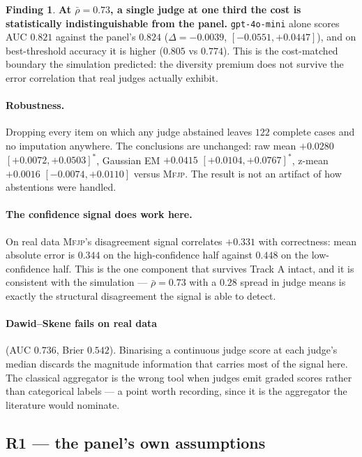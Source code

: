 \documentclass[11pt]{article}
\theoremstyle{definition}
\newtheorem{finding}{Finding}
\newcommand{\rhobar}{\ensuremath{\bar{\rho}}}
\newcommand{\mfjp}{\textsc{Mfjp}}
\begin{document}
\begin{finding}
\textbf{At $\rhobar=0.73$, a single judge at one third the cost is statistically
indistinguishable from the panel.} \texttt{gpt-4o-mini} alone scores AUC $0.821$ against the
panel's $0.824$ ($\Delta=-0.0039$, $[-0.0551,+0.0447]$), and on best-threshold accuracy it is
higher ($0.805$ vs $0.774$). This is the cost-matched boundary the simulation predicted: the
diversity premium does not survive the error correlation that real judges actually exhibit.
\end{finding}

\paragraph{Robustness.} Dropping every item on which any judge abstained leaves $122$
complete cases and no imputation anywhere. The conclusions are unchanged: raw mean
$+0.0280$ $[+0.0072,+0.0503]^{*}$, Gaussian EM $+0.0415$ $[+0.0104,+0.0767]^{*}$, z-mean
$+0.0016$ $[-0.0074,+0.0110]$ versus \mfjp{}. The result is not an artifact of how
abstentions were handled.

\paragraph{The confidence signal does work here.} On real data \mfjp{}'s disagreement signal
correlates $+0.331$ with correctness: mean absolute error is $0.344$ on the high-confidence
half against $0.448$ on the low-confidence half. This is the one component that survives Track
A intact, and it is consistent with the simulation --- $\rhobar=0.73$ with a $0.28$ spread in
judge means is exactly the structural disagreement the signal is able to detect.

\paragraph{Dawid--Skene fails on real data} (AUC $0.736$, Brier $0.542$). Binarising a
continuous judge score at each judge's median discards the magnitude information that carries
most of the signal here. The classical aggregator is the wrong tool when judges emit graded
scores rather than categorical labels --- a point worth recording, since it is the aggregator
the literature would nominate.

\subsection{R1 --- the panel's own assumptions}
\end{document}
